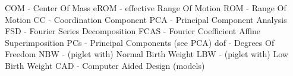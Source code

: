 COM - Center Of Mass
eROM - effective Range Of Motion
ROM - Range Of Motion
CC - Coordination Component
PCA - Principal Component Analysis
FSD - Fourier Series Decomposition
FCAS - Fourier Coefficient Affine Superimposition
PCs - Principal Components (see PCA)
dof - Degrees Of Freedom
NBW - (piglet with) Normal Birth Weight
LBW - (piglet with) Low Birth Weight
CAD - Computer Aided Design (models)
